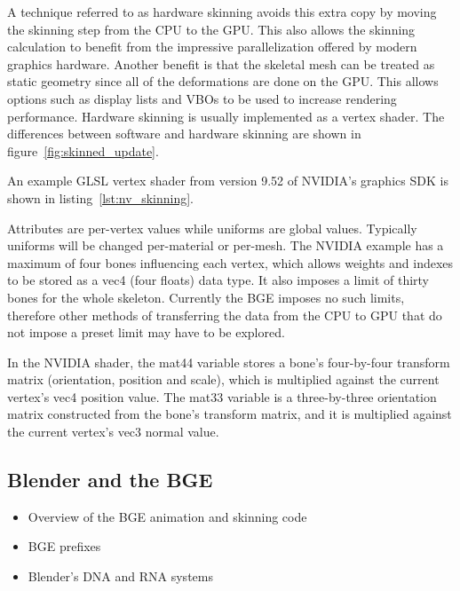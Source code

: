 A technique referred to as hardware skinning avoids this extra copy by moving the skinning step from the CPU to the GPU.
This also allows the skinning calculation to benefit from the impressive parallelization offered by modern graphics hardware.
Another benefit is that the skeletal mesh can be treated as static geometry since all of the deformations are done on the GPU.
This allows options such as display lists and VBOs to be used to increase rendering performance.
Hardware skinning is usually implemented as a vertex shader.
The differences between software and hardware skinning are shown in figure~\ref{fig:skinned_update}.


An example GLSL vertex shader from version 9.52 of NVIDIA's graphics SDK\cite{nvidiasdk} is shown in listing~\ref{lst:nv_skinning}.


Attributes are per-vertex values while uniforms are global values.
Typically uniforms will be changed per-material or per-mesh.
The NVIDIA example has a maximum of four bones influencing each vertex, which allows weights and indexes to be stored as a vec4 (four floats) data type.
It also imposes a limit of thirty bones for the whole skeleton.
Currently the BGE imposes no such limits, therefore other methods of transferring the data from the CPU to GPU that do not impose a preset limit may have to be explored.

In the NVIDIA shader, the mat44 variable stores a bone's four-by-four transform matrix (orientation, position and scale), which is multiplied against the current vertex's vec4 position value.
The mat33 variable is a three-by-three orientation matrix constructed from the bone's transform matrix, and it is multiplied against the current vertex's vec3 normal value.

\subsection{Blender and the BGE}
\ifsummaries
\begin{itemize}
 \item Overview of the BGE animation and skinning code
 \item BGE prefixes
 \item Blender's DNA and RNA systems
\end{itemize}
\fi

